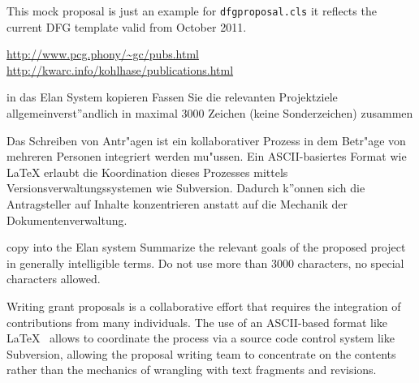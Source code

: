 \documentclass[RAM,gitinfo\classoptions]{dfgproposal}
\begin{document}
\begin{center}\color{red}\huge
  This mock proposal is just an example for \texttt{dfgproposal.cls} it reflects the 
  current DFG template valid from October 2011.
\end{center}

\urldef{\gcpubs}\url{http://www.pcg.phony/~gc/pubs.html}
\urldef{\mikopubs}\url{http://kwarc.info/kohlhase/publications.html}
\begin{proposal}[PI=miko,PI=gc,site=jacu,site=pcg,
  thema=Intelligentes Schreiben von Antr\"agen,
  acronym={iPoWr},
  acrolong={\underline{I}ntelligent} {\underline{P}r\underline{o}posal} {\underline{Wr}iting},
  title=\pn: \protect\pnlong,
  totalduration=3 years,
  since=1. Feb 2009,
  start=1. Feb. 2010,
  months=24,
  pcgRM=36, pcgRAM=36, jacuRM=36, jacuRAM=36,
  discipline=Computer Science, 
  areas=Knowledge Management]

\begin{Zusammenfassung}
  \begin{todo}{in das Elan System kopieren}
    Fassen Sie die relevanten Projektziele allgemeinverst''andlich in maximal 3000 Zeichen
    (keine Sonderzeichen) zusammen
  \end{todo}
  Das Schreiben von Antr"agen ist ein kollaborativer Prozess in dem Betr"age von mehreren
  Personen integriert werden mu"ussen. Ein ASCII-basiertes Format wie {\LaTeX} erlaubt die
  Koordination dieses Prozesses mittels Versionsverwaltungssystemen wie
  Subversion. Dadurch k''onnen sich die Antragsteller auf Inhalte konzentrieren anstatt
  auf die Mechanik der Dokumentenverwaltung.
\end{Zusammenfassung}

\begin{Summary}
  \begin{todo}{copy into the Elan system}
    Summarize the relevant goals of the proposed project in generally intelligible
    terms. Do not use more than 3000 characters, no special characters allowed.
  \end{todo}
  Writing grant proposals is a collaborative effort that requires the integration of
  contributions from many individuals. The use of an ASCII-based format like
  {\LaTeX}~\cite{Lamport:ladps94} allows to coordinate the process via a source code
  control system like Subversion, allowing the proposal writing team to concentrate on the
  contents rather than the mechanics of wrangling with text fragments and revisions.
\end{Summary}


\end{proposal}
\end{document}
